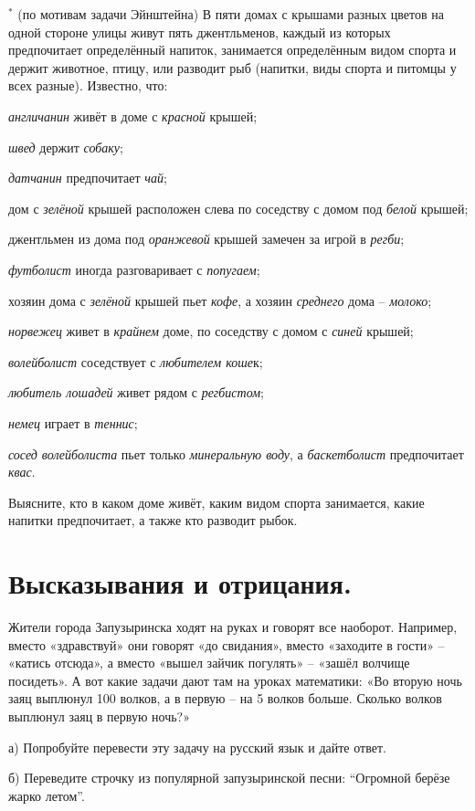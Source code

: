 \begin{thm} $^*$
    (по мотивам задачи Эйнштейна\footnotemark) В пяти домах с крышами разных цветов на одной стороне улицы живут пять джентльменов, каждый из которых предпочитает определённый напиток, занимается определённым видом спорта и держит животное, птицу, или разводит рыб (напитки, виды спорта и питомцы у всех разные). Известно, что:
    \par \textit{англичанин} живёт в доме с \textit{красной} крышей; 
    \par \textit{швед} держит \textit{собаку};
    \par \textit{датчанин} предпочитает \textit{чай}; 
    \par дом с \textit{зелёной} крышей расположен слева по соседству с домом под \textit{белой} крышей; 
    \par джентльмен из дома под \textit{оранжевой} крышей замечен за игрой в \textit{регби};
    \par \textit{футболист} иногда разговаривает с \textit{попугаем}; 
    \par хозяин дома с \textit{зелёной} крышей пьет \textit{кофе}, а хозяин \textit{среднего} дома – \textit{молоко};
    \par \textit{норвежец} живет в \textit{крайнем} доме, по соседству с домом с \textit{синей} крышей; 
    \par \textit{волейболист} соседствует с \textit{любителем коше}к; 
    \par \textit{любитель лошадей} живет рядом с \textit{регбистом}; 
    \par \textit{немец} играет в \textit{теннис}; 
    \par \textit{сосед волейболиста} пьет только \textit{минеральную воду}, а \textit{баскетболист} предпочитает \textit{квас}.
    \par Выясните, кто в каком доме живёт, каким видом спорта занимается, какие напитки предпочитает, а также кто разводит рыбок.
\end{thm}

\section{Высказывания и отрицания.}

\begin{thm}
    Жители города Запузыринска ходят на руках и говорят все наоборот. Например, вместо «здравствуй» они говорят «до свидания», вместо «заходите в гости» – «катись отсюда», а вместо «вышел зайчик погулять» – «зашёл волчище посидеть». А вот какие задачи дают там на уроках математики: «Во вторую ночь заяц выплюнул 100 волков, а в первую – на 5 волков больше. Сколько волков выплюнул заяц в первую ночь?»
    \par
    а) Попробуйте перевести эту задачу на русский язык и дайте ответ.
    \par
    б) Переведите строчку из популярной запузыринской песни: “Огромной берёзе жарко летом”.
\end{thm}

